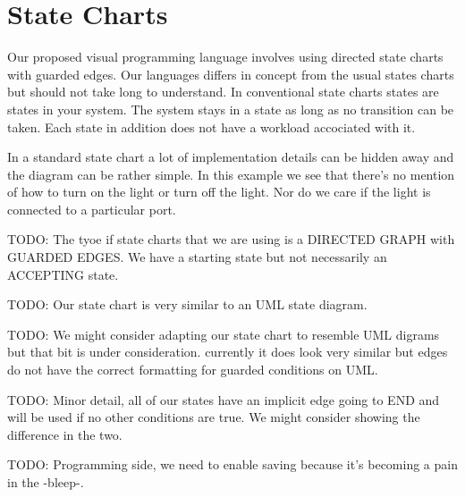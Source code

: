 \section{State Charts}

Our proposed visual programming language involves using directed state charts with guarded edges. Our languages differs in concept from the usual states charts but should not take long to understand. In conventional state charts states are states in your system. The system stays in a state as long as no transition can be taken. Each state in addition does not have a workload accociated with it.


In a standard state chart a lot of implementation details can be hidden away and the diagram can be rather simple. In this example we see that there's no mention of how to turn on the light or turn off the light. Nor do we care if the light is connected to a particular port.

TODO: The tyoe if state charts that we are using is a DIRECTED GRAPH with GUARDED EDGES. We have a starting state but not necessarily an ACCEPTING state.

TODO: Our state chart is very similar to an UML state diagram.

TODO: We might consider adapting our state chart to resemble UML digrams but that bit is under consideration. currently it does look very similar but edges do not have the correct formatting for guarded conditions on UML.

TODO: Minor detail, all of our states have an implicit edge going to END and will be used if no other conditions are true. We might consider showing the difference in the two.

TODO: Programming side, we need to enable saving because it's becoming a pain in the -bleep-.
